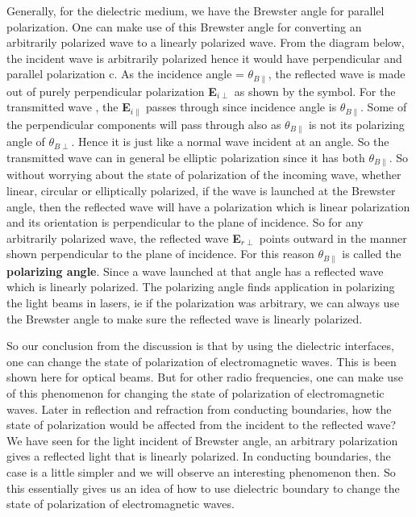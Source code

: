 Generally, for the dielectric medium, we have the Brewster angle for parallel polarization. One can make use of this Brewster angle for converting an arbitrarily polarized wave to a linearly polarized wave. From the diagram below, the incident wave is arbitrarily polarized hence it would have perpendicular and parallel polarization c. As the incidence angle = $\theta_{B\parallel}$, the reflected wave is made out of purely perpendicular polarization \textbf{E}$_{i\perp}$ as shown by the symbol. For the transmitted wave , the \textbf{E}$_{i\parallel}$ passes through since incidence angle is $\theta_{B\parallel}$. Some of the perpendicular components will pass through also as $\theta_{B\parallel}$ is not its polarizing angle of $\theta_{B\perp}$. Hence it is just like a normal wave incident at an angle. So the transmitted wave can in general be elliptic polarization since it has both $\theta_{B\parallel}$. So without worrying about the state of polarization of the incoming wave, whether linear, circular or elliptically polarized, if the wave is launched at the Brewster angle, then the reflected wave will have a polarization which is linear polarization and its orientation is perpendicular to the plane of incidence. So for any arbitrarily polarized wave, the reflected wave \textbf{E}$_{r\perp}$ points outward in the manner shown perpendicular to the plane of incidence. For this reason $\theta_{B\parallel}$ is called the \textbf{polarizing angle}. Since a wave launched at that angle has a reflected wave which is linearly polarized. The polarizing angle finds application in polarizing the light beams in lasers, ie if the polarization was arbitrary, we can always use the Brewster angle to make sure the reflected wave is linearly polarized. 

So our conclusion from the discussion is that by using the dielectric interfaces, one can change the state of polarization of electromagnetic waves. This is been shown here for optical beams. But for other radio frequencies, one can make use of this phenomenon for changing the state of polarization of electromagnetic waves.
Later in reflection and refraction from conducting boundaries, how the state of polarization would be affected from the incident to the reflected wave?  We have seen for the light incident of Brewster angle, an arbitrary polarization gives a reflected light that is linearly polarized. In conducting boundaries, the case is a little simpler and we will observe an interesting phenomenon then. So this essentially gives us an idea of how to use dielectric boundary to change the state of polarization of electromagnetic waves. 

